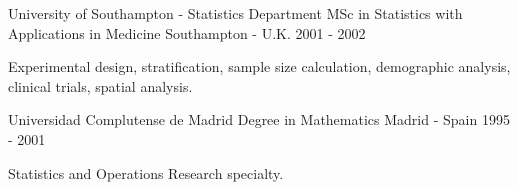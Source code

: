 \begin{cventries}
\cventry
{University of Southampton - Statistics Department} %
{MSc in Statistics with Applications in Medicine} %
{Southampton - U.K.} %
{2001 - 2002} %
{ %
\begin{cvitems}
\item {Experimental design, stratification, sample size calculation, demographic analysis, clinical trials, spatial analysis.}
\end{cvitems}
}

\cventry
{Universidad Complutense de Madrid} %
{Degree in Mathematics} %
{Madrid - Spain} %
{1995 - 2001} %
{ %
\begin{cvitems}
\item {Statistics and Operations Research specialty.}
\end{cvitems}
}



\end{cventries}
